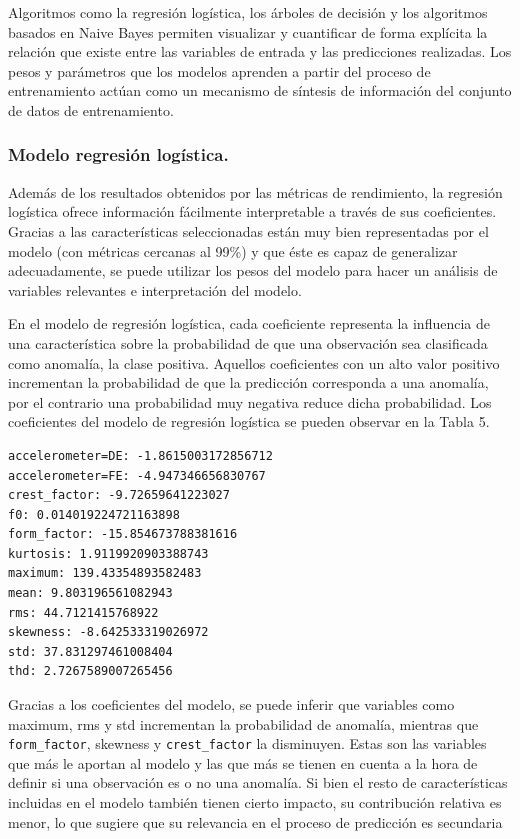 \documentclass[11pt,a4paper,spanish]{book}
\numberwithin{equation}{chapter}
\numberwithin{figure}{chapter}
\begin{document}
Algoritmos como la regresión logística, los árboles de decisión y los algoritmos basados 
en Naive Bayes permiten visualizar y cuantificar de forma explícita la relación que 
existe entre las variables de entrada y las predicciones realizadas. Los pesos y 
parámetros que los modelos aprenden a partir del proceso de entrenamiento actúan como 
un mecanismo de síntesis de información del conjunto de datos de entrenamiento. 

\subsubsection{Modelo regresión logística.}

Además de los resultados obtenidos por las métricas de rendimiento, la regresión 
logística ofrece información fácilmente interpretable a través de sus coeficientes. 
Gracias a las características seleccionadas están muy bien representadas por el modelo 
(con métricas cercanas al 99\%) y que éste es capaz de generalizar adecuadamente, 
se puede utilizar los pesos del modelo para hacer un análisis de variables relevantes 
e interpretación del modelo.  


En el modelo de regresión logística, cada coeficiente representa la influencia de una 
característica sobre la probabilidad de que una observación sea clasificada como anomalía, 
la clase positiva. Aquellos coeficientes con un alto valor positivo incrementan la 
probabilidad de que la predicción corresponda a una anomalía, por el contrario una 
probabilidad muy negativa reduce dicha probabilidad. Los coeficientes del modelo de 
regresión logística se pueden observar en la Tabla 5. 


\vspace{5mm}
\begin{lstlisting}[language={}, basicstyle=\ttfamily\footnotesize\color{black}, frame=lines]
accelerometer=DE: -1.8615003172856712
accelerometer=FE: -4.947346656830767
crest_factor: -9.72659641223027
f0: 0.014019224721163898
form_factor: -15.854673788381616
kurtosis: 1.9119920903388743
maximum: 139.43354893582483
mean: 9.803196561082943
rms: 44.7121415768922
skewness: -8.642533319026972
std: 37.831297461008404
thd: 2.7267589007265456
\end{lstlisting}


Gracias a los coeficientes del modelo, se puede inferir que variables como maximum, rms 
y std incrementan la probabilidad de anomalía, mientras que \lstinline|form_factor|, 
skewness y \lstinline|crest_factor| la disminuyen. 
Estas son las variables que más le aportan al modelo y las que más se tienen en cuenta 
a la hora de definir si una observación es o no una anomalía. Si bien el resto de 
características incluidas en el modelo también tienen cierto impacto, su contribución 
relativa es menor, lo que sugiere que su relevancia en el proceso de predicción es 
secundaria
\end{document}
